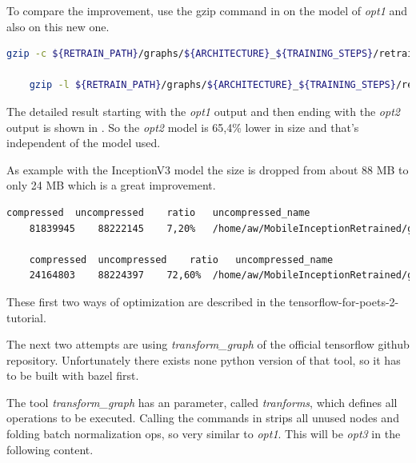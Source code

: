 To compare the improvement, use the gzip command in  on the model of \textit{opt1} and also on this new one. 

\begin{minipage}{\linewidth}
\begin{lstlisting}[caption=Call of gzip, label=list:gzip, language=bash]
	gzip -c ${RETRAIN_PATH}/graphs/${ARCHITECTURE}_${TRAINING_STEPS}/retrained_dog_graph_${ARCHITECTURE}_${TRAINING_STEPS}_${LEARNING_RATE}.pb > ${RETRAIN_PATH}/graphs/${ARCHITECTURE}_${TRAINING_STEPS}/retrained_dog_graph_${ARCHITECTURE}_${TRAINING_STEPS}_${LEARNING_RATE}.pb.gz

	gzip -l ${RETRAIN_PATH}/graphs/${ARCHITECTURE}_${TRAINING_STEPS}/retrained_dog_graph_${ARCHITECTURE}_${TRAINING_STEPS}_${LEARNING_RATE}.pb.gz
\end{lstlisting}
\end{minipage}

The detailed result starting with the \textit{opt1} output and then ending with the \textit{opt2} output is shown in . So the \textit{opt2} model is 65,4\% lower in size and that's independent of the model used. 

As example with the InceptionV3 model the size is dropped from about 88 MB to only 24 MB which is a great improvement.

\begin{minipage}{\linewidth}
\begin{lstlisting}[caption=Output of gzip, label=list:gzip_res, language=bash]
	compressed	uncompressed	ratio	uncompressed_name
	81839945	88222145	7,20%	/home/aw/MobileInceptionRetrained/graphs/inception_v3_4000/opt1_retrained_dog_graph_inception_v3_4000_0.03.pb

	compressed	uncompressed	ratio	uncompressed_name
	24164803	88224397	72,60%	/home/aw/MobileInceptionRetrained/graphs/inception_v3_4000/opt2_retrained_dog_graph_inception_v3_4000_0.03.pb
\end{lstlisting}
\end{minipage}


These first two ways of optimization are described in the tensorflow-for-poets-2-tutorial. 

The next two attempts are using \textit{transform_graph} of the official tensorflow github repository. Unfortunately there exists none python version of that tool, so it has to be built with bazel first. 

The tool \textit{transform_graph} has an parameter, called \textit{tranforms}, which defines all operations to be executed. Calling the commands in  strips all unused nodes and folding batch normalization ops, so very similar to \textit{opt1}. This will be \textit{opt3} in the following content.

